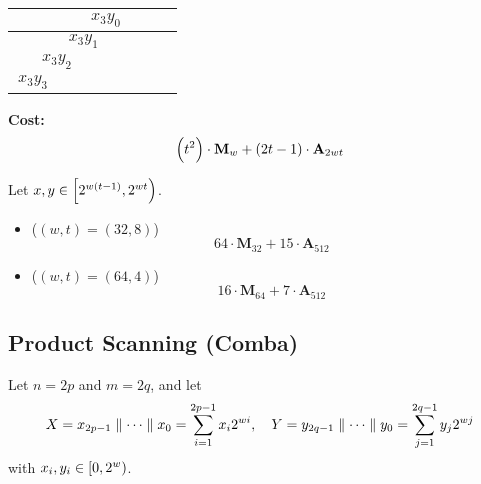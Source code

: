 \begin{center}
\begin{tabular}{|c|c|c|c|c|c|c|c|}
\hspace{15pt} & \hspace{15pt} & \hspace{15pt} & \multicolumn{2}{c|}{$x_3y_0$} & \hspace{15pt} & \hspace{15pt} & \hspace{15pt} \\ \hline
\hspace{15pt} & \hspace{15pt} & \multicolumn{2}{c|}{$x_3y_1$} & \hspace{15pt} & \hspace{15pt} & \hspace{15pt} & \hspace{15pt} \\ \hline
\hspace{15pt} & \multicolumn{2}{c|}{$x_3y_2$} & \hspace{15pt} & \hspace{15pt} & \hspace{15pt} & \hspace{15pt} & \hspace{15pt} \\ \hline
\multicolumn{2}{|c|}{$x_3y_3$} & \hspace{15pt} & \hspace{15pt} & \hspace{15pt} & \hspace{15pt} & \hspace{15pt} & \hspace{15pt} \\ \hline
\end{tabular}
\end{center}
\noindent\textbf{Cost:} \[
\left(t^2\right)\cdot\textbf{M}_{w} + (2t - 1)\cdot\textbf{A}_{2wt}
\]

\begin{example}
	Let $x,y\in\intco{2^{w(t-1)},2^{wt}}$.
	\begin{itemize}
		\item[] ($(w,t)=(32,8)$) \[
		64\cdot\textbf{M}_{32} + 15\cdot\textbf{A}_{512}
		\]
		\item[] ($(w,t)=(64,4)$) \[
		16\cdot\textbf{M}_{64} + 7\cdot\textbf{A}_{512}
		\]
	\end{itemize}
\end{example}

\newpage
\subsection{Product Scanning (Comba)}
Let $n=2p$ and $m=2q$, and let \begin{align*}
X=x_{2p-1}\parallel\cdots\parallel x_0=\sum_{i=1}^{2p-1}x_i2^{wi},\quad
Y=y_{2q-1}\parallel\cdots\parallel y_0=\sum_{j=1}^{2q-1}y_j2^{wj}
\end{align*} with $x_i,y_i\in\intco{0,2^w}$.

